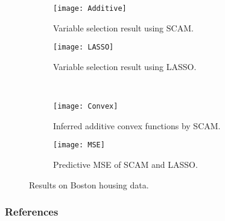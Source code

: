 \documentclass{article} %
\begin{document}
\begin{figure}[!htpb]
        \centering
        \begin{subfigure}[b]{0.45\textwidth}
                \centering
                \texttt{[image: Additive]}
                 \caption{Variable selection result using SCAM.}
                \label{SCAM}
        \end{subfigure}
        \begin{subfigure}[b]{0.45\textwidth}
                \centering
                \texttt{[image: LASSO]}
                \caption{Variable selection result using LASSO.}
                \label{LASSO}
        \end{subfigure}\\
        \begin{subfigure}[b]{0.45\textwidth}
                \centering
                \texttt{[image: Convex]}
                \caption{Inferred additive convex functions by SCAM.}
                \label{Convex}
        \end{subfigure}
        \begin{subfigure}[b]{0.45\textwidth}
                \centering
                \texttt{[image: MSE]}
                 \caption{Predictive MSE of SCAM and LASSO.}
                 \label{MSE}
        \end{subfigure}
        \caption{Results on Boston housing data.}\label{Boston}
\end{figure}


\subsubsection*{References}
\end{document}

